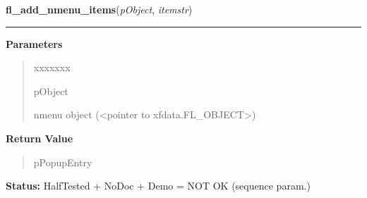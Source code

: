 \hspace{.8\funcindent}\begin{boxedminipage}{\funcwidth}

    \raggedright \textbf{fl\_add\_nmenu\_items}(\textit{pObject}, \textit{itemstr})

    \vspace{-1.5ex}

    \rule{\textwidth}{0.5\fboxrule}
\setlength{\parskip}{2ex}
\setlength{\parskip}{1ex}
      \textbf{Parameters}
      \vspace{-1ex}

      \begin{quote}
        \begin{Ventry}{xxxxxxx}

          \item[pObject]

          nmenu object ({\textless}pointer to 
          xfdata.FL\_OBJECT{\textgreater})

        \end{Ventry}

      \end{quote}

      \textbf{Return Value}
    \vspace{-1ex}

      \begin{quote}
      pPopupEntry

      \end{quote}

\textbf{Status:} HalfTested + NoDoc + Demo = NOT OK (sequence param.)



    \end{boxedminipage}

    \label{xformslib:library:fl_insert_nmenu_items}

    \vspace{0.5ex}

